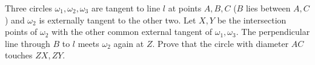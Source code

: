 Three circles $\omega_1,\omega_2,\omega_3$ are tangent to line $l$ at points $A,B,C$ ($B$ lies between $A,C$) and $\omega_2$ is externally tangent to the other two. Let $X,Y$ be the intersection points of $\omega_2$ with the other common external tangent of $\omega_1,\omega_3$. The perpendicular line through $B$ to $l$ meets $\omega_2$ again at $Z$. Prove that the circle with diameter $AC$ touches $ZX,ZY$.